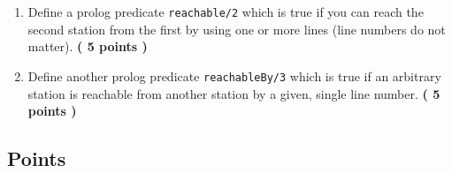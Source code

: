 \documentclass [11pt, a4wide, twoside]{article}
\begin{document}
\begin{enumerate}
\item Define a prolog predicate \texttt{reachable/2} which is true if you can reach the second station from the first by using one or more lines (line numbers do not matter). \textbf{( 5 points )} \vspace{5cm}
\item Define another prolog predicate \texttt{reachableBy/3} which is true if an arbitrary station is reachable from another station by a given, single line number. \textbf{( 5 points )}\vspace{5cm}
\end{enumerate}



\solution{\fontsize{8}{10}}


\newpage
\subsection*{Points}
\end{document}
